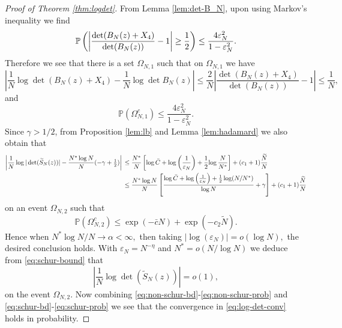 \documentclass{amsart}
\numberwithin{equation}{section}
\def\corAB{}
\begin{document}
\begin{proof}[Proof of Theorem \ref{thm:logdet}]
From Lemma \ref{lem:det-B_N}, upon using Markov's inequality we find
\begin{equation}
\mathbb{P} \left(\left| \frac{\det(B_N(z)+X_4)}{\det(B_N(z))}-1 \right| \ge \frac{1}{2} \right) \le \frac{4\varepsilon_N^2}{1-\varepsilon_N^2}. \notag
\end{equation}
Therefore we see that there is a set $\Omega_{N,1}$ such that on $\Omega_{N,1}$ we have
\begin{equation}\label{eq:non-schur-bd}
\left|\frac{1}{N} \log \det(B_N(z)+X_4) - \frac{1}{N}\log \det B_N(z)\right| \le  \corAB{\frac{2}{N}} \left| \frac{\det(B_N(z)+X_4)}{\det(B_N(z))}-1\right| \le \corAB{\frac{{1}}{N}},
\end{equation}
and
\begin{equation}\label{eq:non-schur-prob}
\mathbb{P}(\Omega_{N,1}^c) \le \frac{4\varepsilon_N^2}{1-\varepsilon_N^2}.
\end{equation}
Since $\gamma >1/2$, from Proposition \ref{lem:lb} and Lemma \ref{lem:hadamard} we also obtain that
\begin{align}
\left|
\frac{1}{N} \log |\det(\widetilde{S}_N(z))|
-
\frac{N^*\log N}{N}(-\gamma + \tfrac{1}{2})
\right| & \, \le\frac{N^* }{N} \left[{\log\bar{C}}+ {\log \left( \frac{1}{\varepsilon_N}\right)}+\frac{1}{2}{\log\frac{N}{N^*}}\right]+\corAB{(c_1+1)} \frac{\widetilde{N}}{N} \notag\\
& \, \le \frac{N^* \log N}{N} \left[\frac{\log\bar{C}+\log \left( \frac{1}{\varepsilon_N}\right)+\frac{1}{2}\log (N/N^*)}{\log N} + \gamma\right]+ \corAB{(c_1+1)} \frac{\widetilde{N}}{N} \label{eq:schur-bound}
\end{align}
on an event $\Omega_{N,2}$ such that
\begin{equation}\label{eq:schur-bd}
\mathbb{P}(\Omega_{N,2}^c) \le \exp(-\bar{c}N)+ \exp(-c_2 \widetilde{N}).
\end{equation}
Hence when $N^* \log N / N \to \alpha < \infty,$ then taking $\corAB{|\log(\varepsilon_N)|} = o(\log N),$ the desired conclusion holds.
With $\varepsilon_N=N^{-\eta}$ and $N^*=o(N/\log N)$ we deduce from \eqref{eq:schur-bound} that
\begin{equation}\label{eq:schur-prob}
\left|\frac{1}{N} \log \det(\widetilde{S}_N(z))\right| =o(1),
\end{equation}
on the event $\Omega_{N,2}$. Now combining \eqref{eq:non-schur-bd}-\eqref{eq:non-schur-prob} and \eqref{eq:schur-bd}-\eqref{eq:schur-prob} we see that the convergence in \eqref{eq:log-det-conv} holds in probability.
\end{proof}
\end{document}
